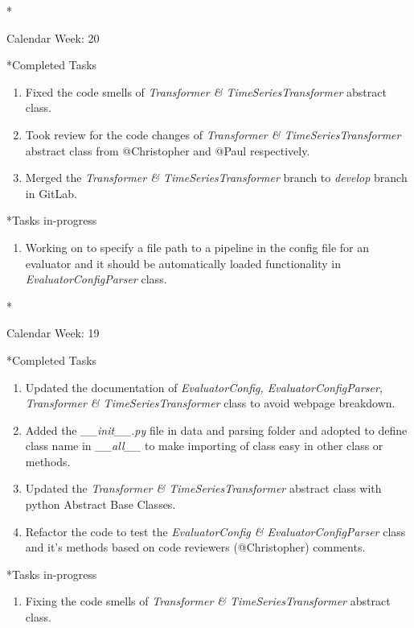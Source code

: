 \documentclass[11pt,a4paper]{article}
\begin{document}
\newpage
\begin{section}*{Calendar Week: 20 \hfill \date{21 May, 2021}}
 \begin{subsection}*{Completed Tasks}
     \begin{enumerate}
         \item Fixed the code smells of \textit{Transformer \& TimeSeriesTransformer} abstract class.
         \item Took review for the code changes of \textit{Transformer \& TimeSeriesTransformer} abstract class from @Christopher and @Paul respectively.
         \item Merged the \textit{Transformer \& TimeSeriesTransformer} branch to \textit{develop} branch in GitLab.
     \end{enumerate}
 \end{subsection}
 \begin{subsection}*{Tasks in-progress}
     \begin{enumerate}
         \item Working on to specify a file path to a pipeline in the config file for an evaluator and it should be automatically loaded functionality in \textit{EvaluatorConfigParser} class.
     \end{enumerate}
 \end{subsection}
\end{section}

\newpage
\begin{section}*{Calendar Week: 19 \hfill \date{14 May, 2021}}
 \begin{subsection}*{Completed Tasks}
     \begin{enumerate}
         \item Updated the documentation of \textit{EvaluatorConfig, EvaluatorConfigParser, Transformer \& TimeSeriesTransformer} class to avoid webpage breakdown.
         \item Added the \textit{\_\_init\_\_.py} file in data and parsing folder and adopted to define class name in \textit{\_\_all\_\_} to make importing of class easy in other class or methods.
         \item Updated the \textit{Transformer \& TimeSeriesTransformer} abstract class with python Abstract Base Classes.
         \item Refactor the code to test the \textit{EvaluatorConfig \& EvaluatorConfigParser} class and it's methods based on code reviewers (@Christopher) comments.
     \end{enumerate}
 \end{subsection}
 \begin{subsection}*{Tasks in-progress}
     \begin{enumerate}
         \item Fixing the code smells of \textit{Transformer \& TimeSeriesTransformer} abstract class.
     \end{enumerate}
 \end{subsection}
\end{section}
\end{document}

